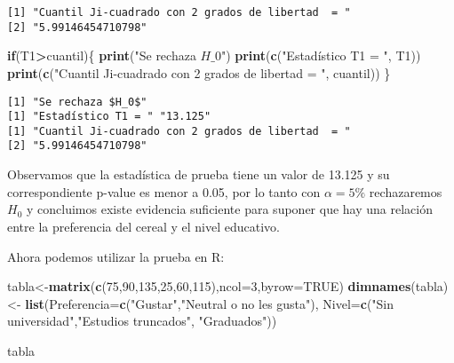 \documentclass[
  a4paper,
  oneside,
  openany]{book}
\newenvironment{Shaded}{\begin{snugshade}}{\end{snugshade}}
\newcommand{\ControlFlowTok}[1]{\textcolor[rgb]{0.13,0.29,0.53}{\textbf{#1}}}
\newcommand{\DataTypeTok}[1]{\textcolor[rgb]{0.13,0.29,0.53}{#1}}
\newcommand{\DecValTok}[1]{\textcolor[rgb]{0.00,0.00,0.81}{#1}}
\newcommand{\KeywordTok}[1]{\textcolor[rgb]{0.13,0.29,0.53}{\textbf{#1}}}
\newcommand{\NormalTok}[1]{#1}
\newcommand{\OperatorTok}[1]{\textcolor[rgb]{0.81,0.36,0.00}{\textbf{#1}}}
\newcommand{\OtherTok}[1]{\textcolor[rgb]{0.56,0.35,0.01}{#1}}
\newcommand{\StringTok}[1]{\textcolor[rgb]{0.31,0.60,0.02}{#1}}
\begin{document}
\begin{verbatim}
[1] "Cuantil Ji-cuadrado con 2 grados de libertad  = "
[2] "5.99146454710798"                                
\end{verbatim}

\begin{Shaded}
\begin{Highlighting}[]
\ControlFlowTok{if}\NormalTok{(T1}\OperatorTok{\textgreater{}}\NormalTok{cuantil)\{}
  \KeywordTok{print}\NormalTok{(}\StringTok{"Se rechaza $H\_0$"}\NormalTok{)}
  \KeywordTok{print}\NormalTok{(}\KeywordTok{c}\NormalTok{(}\StringTok{"Estadístico T1 = "}\NormalTok{, T1))}
  \KeywordTok{print}\NormalTok{(}\KeywordTok{c}\NormalTok{(}\StringTok{"Cuantil Ji{-}cuadrado con 2 grados de libertad  = "}\NormalTok{, cuantil))}
\NormalTok{\}}
\end{Highlighting}
\end{Shaded}

\begin{verbatim}
[1] "Se rechaza $H_0$"
[1] "Estadístico T1 = " "13.125"           
[1] "Cuantil Ji-cuadrado con 2 grados de libertad  = "
[2] "5.99146454710798"                                
\end{verbatim}

Observamos que la estadística de prueba tiene un valor de 13.125 y su correspondiente p-value es menor a 0.05, por lo tanto con \(\alpha=5\%\) rechazaremos \(H_0\) y concluimos existe evidencia suficiente para suponer que hay una relación entre la preferencia del cereal y el nivel
educativo.

Ahora podemos utilizar la prueba en R:

\begin{Shaded}
\begin{Highlighting}[]
\NormalTok{tabla\textless{}{-}}\KeywordTok{matrix}\NormalTok{(}\KeywordTok{c}\NormalTok{(}\DecValTok{75}\NormalTok{,}\DecValTok{90}\NormalTok{,}\DecValTok{135}\NormalTok{,}\DecValTok{25}\NormalTok{,}\DecValTok{60}\NormalTok{,}\DecValTok{115}\NormalTok{),}\DataTypeTok{ncol=}\DecValTok{3}\NormalTok{,}\DataTypeTok{byrow=}\OtherTok{TRUE}\NormalTok{)}
\KeywordTok{dimnames}\NormalTok{(tabla)\textless{}{-}}\StringTok{ }\KeywordTok{list}\NormalTok{(}\DataTypeTok{Preferencia=}\KeywordTok{c}\NormalTok{(}\StringTok{"Gustar"}\NormalTok{,}\StringTok{"Neutral o no les gusta"}\NormalTok{), }\DataTypeTok{Nivel=}\KeywordTok{c}\NormalTok{(}\StringTok{"Sin universidad"}\NormalTok{,}\StringTok{"Estudios truncados"}\NormalTok{,}
                      \StringTok{"Graduados"}\NormalTok{))}


\NormalTok{tabla}
\end{Highlighting}
\end{Shaded}
\end{document}
